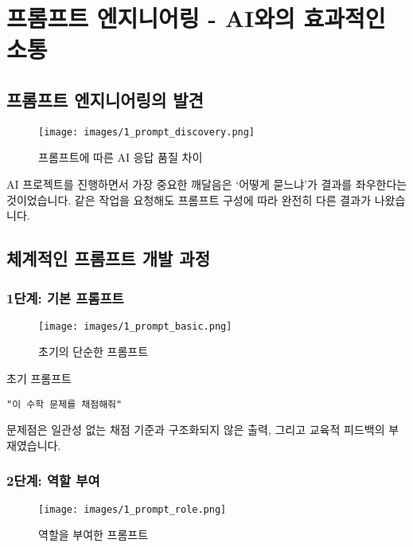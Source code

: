 \section{프롬프트 엔지니어링 - AI와의 효과적인 소통}

\subsection{프롬프트 엔지니어링의 발견}

\begin{figure}[H]
    \centering
    \texttt{[image: images/1\_prompt\_discovery.png]}
    \caption{프롬프트에 따른 AI 응답 품질 차이}
    \label{fig:prompt_discovery}
\end{figure}

AI 프로젝트를 진행하면서 가장 중요한 깨달음은 `어떻게 묻느냐'가 결과를 좌우한다는 것이었습니다. 같은 작업을 요청해도 프롬프트 구성에 따라 완전히 다른 결과가 나왔습니다.

\subsection{체계적인 프롬프트 개발 과정}

\subsubsection{1단계: 기본 프롬프트}

\begin{figure}[H]
    \centering
    \texttt{[image: images/1\_prompt\_basic.png]}
    \caption{초기의 단순한 프롬프트}
    \label{fig:prompt_basic}
\end{figure}

초기 프롬프트
\begin{verbatim}
"이 수학 문제를 채점해줘"
\end{verbatim}

문제점은 일관성 없는 채점 기준과 구조화되지 않은 출력, 그리고 교육적 피드백의 부재였습니다.

\subsubsection{2단계: 역할 부여}

\begin{figure}[H]
    \centering
    \texttt{[image: images/1\_prompt\_role.png]}
    \caption{역할을 부여한 프롬프트}
    \label{fig:prompt_role}
\end{figure}

